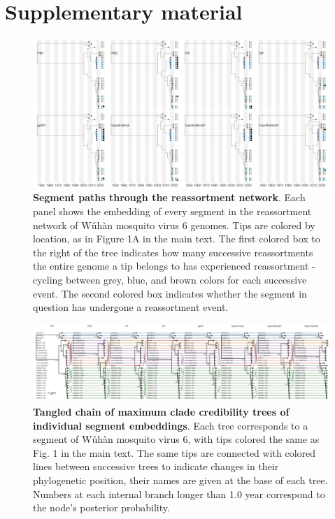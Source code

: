 \documentclass[11pt,twocolumn]{article}
\begin{document}



\onecolumn

\setcounter{figure}{0}
\setcounter{table}{0}
\renewcommand{\thefigure}{S\arabic{figure}}
\renewcommand{\thetable}{S\arabic{table}}


\newpage

\section{Supplementary material}

\pagebreak

\begin{figure}
\centering
\includegraphics[width=\textwidth]{SuppFig1_clonal.png}
\caption{
\textbf{Segment paths through the reassortment network}.
Each panel shows the embedding of every segment in the reassortment network of W\v{u}h\`{a}n mosquito virus 6 genomes.
Tips are colored by location, as in Figure 1A in the main text.
The first colored box to the right of the tree indicates how many successive reassortments the entire genome a tip belongs to has experienced reassortment - cycling between grey, blue, and brown colors for each successive event.
The second colored box indicates whether the segment in question has undergone a reassortment event.
}
\end{figure}

\begin{figure}
\centering
\includegraphics[width=\textwidth]{SuppFig2_BayesTangle.png}
\caption{
\textbf{Tangled chain of maximum clade credibility trees of individual segment embeddings}.
Each tree corresponds to a segment of W\v{u}h\`{a}n mosquito virus 6, with tips colored the same as Fig. 1 in the main text.
The same tips are connected with colored lines between successive trees to indicate changes in their phylogenetic position, their names are given at the base of each tree.
Numbers at each internal branch longer than 1.0 year correspond to the node's posterior probability.
}
\end{figure}
\end{document}

